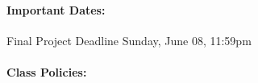 \documentclass[11pt, a4paper]{article}
\begin{document}
\paragraph{Important Dates:}
\begin{center} \begin{minipage}{3.8in}
\begin{flushleft}
Final Project Deadline      \dotfill Sunday, June 08, 11:59pm  \\
\end{flushleft}
\end{minipage}
\end{center}

\paragraph{Class Policies:}
\end{document}
